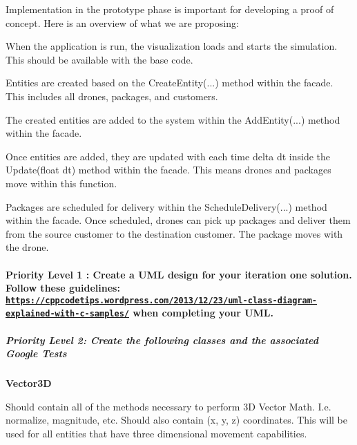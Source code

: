 Implementation in the prototype phase is important for developing a proof of concept. Here is an overview of what we are proposing\+:


\begin{DoxyEnumerate}
\item When the application is run, the visualization loads and starts the simulation. This should be available with the base code.
\item Entities are created based on the \textquotesingle{}Create\+Entity(...)\textquotesingle{} method within the facade. This includes all \textquotesingle{}drones\textquotesingle{}, \textquotesingle{}packages\textquotesingle{}, and \textquotesingle{}customers\textquotesingle{}.
\item The created entities are added to the system within the \textquotesingle{}Add\+Entity(...)\textquotesingle{} method within the facade.
\item Once entities are added, they are updated with each time delta dt inside the \textquotesingle{}Update(float dt)\textquotesingle{} method within the facade. This means drones and packages move within this function.
\item Packages are scheduled for delivery within the \textquotesingle{}Schedule\+Delivery(...)\textquotesingle{} method within the facade. Once scheduled, drones can pick up packages and deliver them from the source customer to the destination customer. The package moves with the drone.
\end{DoxyEnumerate}

\paragraph*{Priority Level 1 \+: Create a U\+ML design for your iteration one solution. Follow these guidelines\+: \href{https://cppcodetips.wordpress.com/2013/12/23/uml-class-diagram-explained-with-c-samples/}{\tt https\+://cppcodetips.\+wordpress.\+com/2013/12/23/uml-\/class-\/diagram-\/explained-\/with-\/c-\/samples/} when completing your U\+ML.}

\subparagraph*{Priority Level 2\+: Create the following classes and the associated Google Tests}

{\bfseries Vector3D}

Should contain all of the methods necessary to perform 3D Vector Math. I.\+e. normalize, magnitude, etc. Should also contain (x, y, z) coordinates. This will be used for all entities that have three dimensional movement capabilities.

